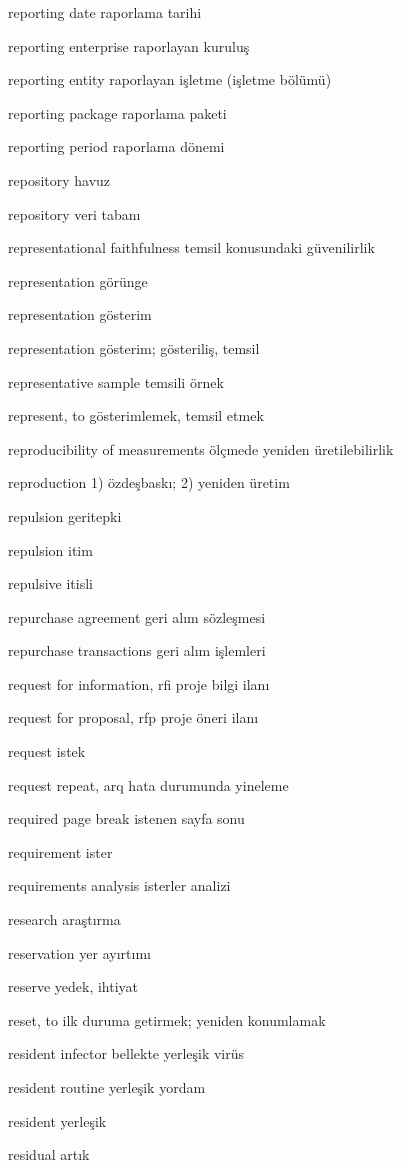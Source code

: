 \documentclass[12pt,fleqn]{article}\usepackage{../../common}
\begin{document}
reporting date raporlama tarihi

reporting enterprise raporlayan kuruluş

reporting entity raporlayan işletme (işletme bölümü)

reporting package raporlama paketi

reporting period raporlama dönemi

repository havuz

repository veri tabanı

representational faithfulness temsil konusundaki güvenilirlik

representation görünge

representation gösterim

representation gösterim; gösteriliş, temsil

representative sample temsili örnek

represent, to gösterimlemek, temsil etmek

reproducibility of measurements ölçmede yeniden üretilebilirlik

reproduction 1) özdeşbaskı; 2) yeniden üretim

repulsion geritepki

repulsion itim

repulsive itisli

repurchase agreement geri alım sözleşmesi

repurchase transactions geri alım işlemleri

request for information, rfi proje bilgi ilanı

request for proposal, rfp proje öneri ilanı

request istek

request repeat, arq hata durumunda yineleme

required page break istenen sayfa sonu

requirement ister

requirements analysis isterler analizi

research araştırma

reservation yer ayırtımı

reserve yedek, ihtiyat

reset, to ilk duruma getirmek; yeniden konumlamak

resident infector bellekte yerleşik virüs

resident routine yerleşik yordam

resident yerleşik

residual artık
\end{document}
